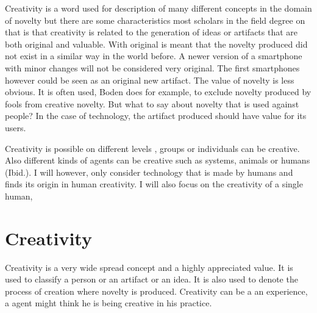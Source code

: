 Creativity is a word used for description of many different concepts in the domain of novelty but there are some characteristics most scholars in the field degree on that is that creativity is related to the generation of ideas or artifacts that are both original and valuable. With original is meant that the novelty produced did not exist in a similar way in the world before. A newer version of a smartphone with minor changes will not be considered very original. The first smartphones however could be seen as an original new artifact. 
The value of novelty is less obvious. It is often used, Boden does for example, to exclude novelty produced by fools from creative novelty. But what to say about novelty that is used against people? In the case of technology, the artifact produced should have value for its users.


Creativity is possible on different levels \cite{Ferguson2010}, groups or individuals can be creative. Also different kinds of agents can be creative such as systems, animals or humans (Ibid.). I will however, only consider technology that is made by humans and finds its origin  in human creativity. I will also focus on the creativity of a single human,

\section{Creativity}


Creativity is a very wide spread concept and a highly appreciated value. It is used to classify a person or an artifact or an idea.  It is also used to denote the process of creation where novelty is produced. Creativity can be a an experience, a agent might think he is being creative in his practice.

